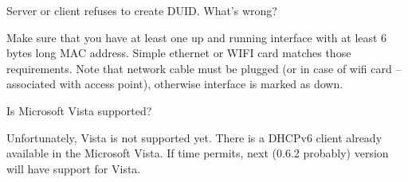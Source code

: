 \Q Server or client refuses to create DUID. What's wrong?

\A Make sure that you have at least one up and running interface with
at least 6 bytes long MAC address. Simple ethernet or WIFI card
matches those requirements. Note that network cable must be plugged
(or in case of wifi card -- associated with access point), otherwise
interface is marked as down.

\Q Is Microsoft Vista supported?

\A Unfortunately, Vista is not supported yet. There is a DHCPv6 client
already available in the Microsoft Vista. If time permits, next (0.6.2
probably) version will have support for Vista.



